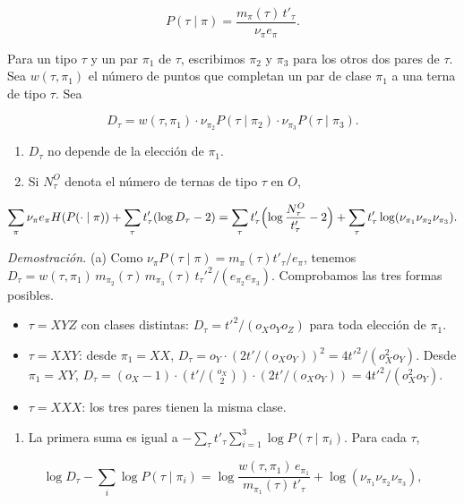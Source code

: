 \documentclass[spanish,11pt,a4paper]{article}
\providecommand{\tightlist}{\setlength{\itemsep}{0pt}\setlength{\parskip}{0pt}}
\begin{document}
\nopagebreak[4]
\[P(\tau\mid\pi)=\frac{m_\pi(\tau)\,t'_\tau}{\nu_\pi e_\pi}.\]

Para un tipo \(\tau\) y un par \(\pi_1\) de \(\tau\), escribimos \(\pi_2\) y \(\pi_3\) para los otros dos pares de \(\tau\). Sea \(w(\tau,\pi_1)\) el número de puntos que completan un par de clase \(\pi_1\) a una terna de tipo \(\tau\). Sea

\nopagebreak[4]
\[D_\tau=w(\tau,\pi_1)\cdot\nu_{\pi_2}P(\tau\mid\pi_2)\cdot\nu_{\pi_3}P(\tau\mid\pi_3).\]

\begin{enumerate}
\def\labelenumi{(\alph{enumi})}
\item
  \(D_\tau\) no depende de la elección de \(\pi_1\).
\item
  Si \(N^O_\tau\) denota el número de ternas de tipo \(\tau\) en \(O\),
\end{enumerate}

\nopagebreak[4]
\[\sum_\pi\nu_\pi e_\pi H(P(\cdot\mid\pi))+\sum_\tau t'_\tau(\log D_\tau-2)
=\sum_\tau t'_\tau\Bigl(\log\frac{N^O_\tau}{t'_\tau}-2\Bigr)+\sum_\tau t'_\tau\log(\nu_{\pi_1}\nu_{\pi_2}\nu_{\pi_3}).\]

\emph{Demostración.} (a) Como \(\nu_\pi P(\tau\mid\pi)=m_\pi(\tau)t'_\tau/e_\pi\), tenemos \(D_\tau=w(\tau,\pi_1)\,m_{\pi_2}(\tau)\,m_{\pi_3}(\tau)\,t_\tau'^2/(e_{\pi_2}e_{\pi_3})\). Comprobamos las tres formas posibles.

\begin{itemize}
\tightlist
\item
  \(\tau=XYZ\) con clases distintas: \(D_\tau=t'^2/(o_Xo_Yo_Z)\) para toda elección de \(\pi_1\).
\item
  \(\tau=XXY\): desde \(\pi_1=XX\), \(D_\tau=o_Y\cdot(2t'/(o_Xo_Y))^2=4t'^2/(o_X^2o_Y)\). Desde \(\pi_1=XY\), \(D_\tau=(o_X-1)\cdot(t'/\binom{o_X}{2})\cdot(2t'/(o_Xo_Y))=4t'^2/(o_X^2o_Y)\).
\item
  \(\tau=XXX\): los tres pares tienen la misma clase.
\end{itemize}

\begin{enumerate}
\def\labelenumi{(\alph{enumi})}
\setcounter{enumi}{1}
\tightlist
\item
  La primera suma es igual a \(-\sum_\tau t'_\tau\sum_{i=1}^{3}\log P(\tau\mid\pi_i)\). Para cada \(\tau\),
\end{enumerate}

\nopagebreak[4]
\[\log D_\tau-\sum_i\log P(\tau\mid\pi_i)=\log\frac{w(\tau,\pi_1)\,e_{\pi_1}}{m_{\pi_1}(\tau)\,t'_\tau}+\log(\nu_{\pi_1}\nu_{\pi_2}\nu_{\pi_3}),\]
\end{document}
